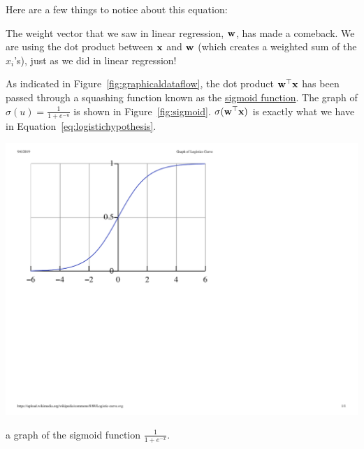 \documentclass[assignment04_Solutions]{subfiles}
\begin{document}
Here are a few things to notice about this equation:
\be
\item The weight vector that we saw in linear regression, $\mathbf{w}$, has made a comeback. We are using the dot product between $\mathbf{x}$ and $\mathbf{w}$ (which creates a weighted sum of the $x_i$'s), just as we did in linear regression!
\item As indicated in Figure~\ref{fig:graphicaldataflow}, the dot product $\mathbf{w}^\top \mathbf{x}$ has been passed through a squashing function known as the \href{https://en.wikipedia.org/wiki/Sigmoid_function}{sigmoid function}.  The graph of $\sigma(u) = \frac{1}{1+e^{-u}}$ is shown in Figure~\ref{fig:sigmoid}.  $\sigma( \mathbf{w}^\top \mathbf{x})$ is exactly what we have in Equation~\ref{eq:logistichypothesis}. 

\begin{marginfigure}
\includegraphics[width=\linewidth]{figures/Logistic-curve}
\caption{a graph of the sigmoid function $\frac{1}{1+e^{-x}}$.}\label{fig:sigmoid}
\end{marginfigure}
\ee


\end{document}
